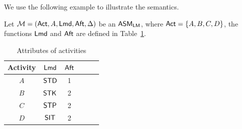 	
	We use the following example to illustrate the semantics.
	\begin{example}
		Let ${\mathcal{M} } = ({\sf Act},A,{\sf Lmd},{\sf Aft},\Delta)$ be an $\textsf{ASM}_\textsf{LM}$, where ${\sf Act} = \{A,B,C,D\}$, the functions ${\sf Lmd}$ and ${\sf Aft}$ are defined in Table~\ref{tab-attribute}.
		\begin{table}[htbp]
			\begin{center}
				\begin{tabular}{|c|c|c|c|c|c|}
					\hline
					Activity & ${\sf Lmd}$ & ${\sf Aft}$\\
					\hline
					$A$ & $\mathsf{STD}$ & 1 \\
					\hline
					$B$ & $\mathsf{STK}$ & 2 \\
					\hline
					$C$ & $\mathsf{STP}$ & 2 \\
					\hline
					$D$ & $\mathsf{SIT}$ & 2 \\
					\hline
				\end{tabular}
				\caption{Attributes of activities}
				\label{tab-attribute}
			\end{center}
		\end{table}
		

\end{example}
